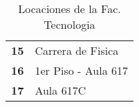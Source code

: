 \begin{table}[H]
\begin{center}
\begin{tabularx}{\textwidth}{ c  X }
      \addlinespace
      \textbf{15}
      &
      Carrera de Fisica
      \\

      \addlinespace
      \textbf{16}
      &
      1{\tiny er} Piso - Aula 617
      \\

      \addlinespace
      \textbf{17}
      &
      Aula 617C
      \\


      \bottomrule
    \end{tabularx}
    \caption{Locaciones de la Fac. Tecnologia}
    \label{tab:lugares_tecnologia}
  \end{center}
\end{table}
